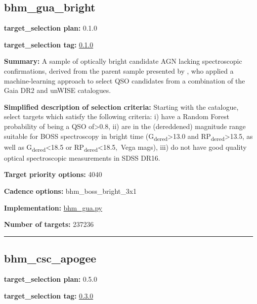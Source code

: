 \hypertarget{bhm_gua_bright_plan0.1.0}{%
\subsection{bhm\_gua\_bright}\label{bhm_gua_bright_plan0.1.0}}

\noindent\textbf{target\_selection plan:} 0.1.0

\noindent\textbf{target\_selection tag:}
\href{https://github.com/sdss/target_selection/tree/0.1.0/}{0.1.0}

\noindent\textbf{Summary:} A sample of optically bright candidate AGN lacking
spectroscopic confirmations, derived from the parent sample presented by
\citet{Shu2019}, who applied a machine-learning approach to select QSO
candidates from a combination of the Gaia DR2 and unWISE catalogues.

\noindent\textbf{Simplified description of selection criteria:} Starting with the
\citet{Shu2019} catalogue, select targets which satisfy the following
criteria: i) have a Random Forest probability of being a QSO
of\textgreater0.8, ii) are in the (dereddened) magnitude range suitable
for BOSS spectroscopy in bright time
(G\textsubscript{dered}\textgreater13.0 and
RP\textsubscript{dered}\textgreater13.5, as well as
G\textsubscript{dered}\textless18.5 or
RP\textsubscript{dered}\textless18.5,~Vega mags), iii) do not have good
quality optical spectroscopic measurements in SDSS DR16.


\noindent\textbf{Target priority options:} 4040

\noindent\textbf{Cadence options:} bhm\_boss\_bright\_3x1

\noindent\textbf{Implementation:}
\href{https://github.com/sdss/target_selection/blob/0.1.0/python/target_selection/cartons/bhm_gua.py}{bhm\_gua.py}

\noindent\textbf{Number of targets:} 237236

\begin{center}\rule{0.5\linewidth}{0.5pt}\end{center}

\hypertarget{bhm_csc_apogee_plan0.5.0}{%
\subsection{bhm\_csc\_apogee}\label{bhm_csc_apogee_plan0.5.0}}

\noindent\textbf{target\_selection plan:} 0.5.0

\noindent\textbf{target\_selection tag:}
\href{https://github.com/sdss/target_selection/tree/0.3.0/}{0.3.0}

